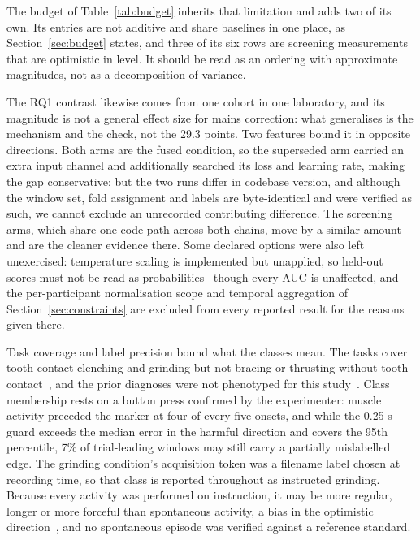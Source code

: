 \documentclass[pdflatex,sn-nature,iicol]{sn-jnl}
\begin{document}
The budget of Table~\ref{tab:budget} inherits that limitation and adds two of its own. Its entries are not additive and share baselines in one place, as Section~\ref{sec:budget} states, and three of its six rows are screening measurements that are optimistic in level. It should be read as an ordering with approximate magnitudes, not as a decomposition of variance.

The RQ1 contrast likewise comes from one cohort in one laboratory, and its magnitude is not a general effect size for mains correction: what generalises is the mechanism and the check, not the 29.3 points. Two features bound it in opposite directions. Both arms are the fused condition, so the superseded arm carried an extra input channel and additionally searched its loss and learning rate, making the gap conservative; but the two runs differ in codebase version, and although the window set, fold assignment and labels are byte-identical and were verified as such, we cannot exclude an unrecorded contributing difference. The screening arms, which share one code path across both chains, move by a similar amount and are the cleaner evidence there. Some declared options were also left unexercised: temperature scaling is implemented but unapplied, so held-out scores must not be read as probabilities~\cite{guo2017calibration} though every AUC is unaffected, and the per-participant normalisation scope and temporal aggregation of Section~\ref{sec:constraints} are excluded from every reported result for the reasons given there.

Task coverage and label precision bound what the classes mean. The tasks cover tooth-contact clenching and grinding but not bracing or thrusting without tooth contact~\cite{verhoeff2025definitions}, and the prior diagnoses were not phenotyped for this study~\cite{manfredini2024standardised}. Class membership rests on a button press confirmed by the experimenter: muscle activity preceded the marker at four of every five onsets, and while the 0.25-s guard exceeds the median error in the harmful direction and covers the 95th percentile, 7\% of trial-leading windows may still carry a partially mislabelled edge. The grinding condition's acquisition token was a filename label chosen at recording time, so that class is reported throughout as instructed grinding. Because every activity was performed on instruction, it may be more regular, longer or more forceful than spontaneous activity, a bias in the optimistic direction~\cite{farella2008masticatory}, and no spontaneous episode was verified against a reference standard.
\end{document}
